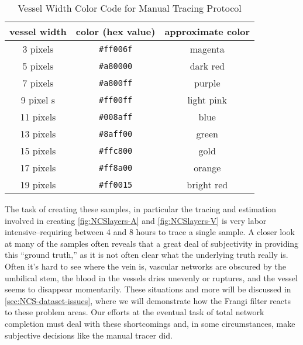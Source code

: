 \begin{table}
    \centering
\begin{tabular}{ccc}
    \hline
    \rule[-1ex]{0pt}{2.5ex}
    vessel width & color (hex value) & approximate color \\
    \hline 
    \rule[-1ex]{0pt}{2.5ex}
    3 pixels &  \texttt{\#ff006f} &   magenta \\                                      
    \rule[-1ex]{0pt}{2.5ex}
    5 pixels & \texttt{\#a80000}  & dark red \\                                      
    \rule[-1ex]{0pt}{2.5ex}
    7 pixels &  \texttt{\#a800ff} & purple \\                                          
    \rule[-1ex]{0pt}{2.5ex}
    9 pixel s&  \texttt{\#ff00ff}  & light pink \\
    \rule[-1ex]{0pt}{2.5ex}
    11 pixels &  \texttt{\#008aff} & blue \\                                          
    \rule[-1ex]{0pt}{2.5ex}
    13 pixels &  \texttt{\#8aff00} &   green \\                                        
    \rule[-1ex]{0pt}{2.5ex}
    15 pixels &  \texttt{\#ffc800} &  gold \\                                    
    \rule[-1ex]{0pt}{2.5ex}
    17 pixels & \texttt{\#ff8a00}  &  orange \\                                         
    \rule[-1ex]{0pt}{2.5ex}
    19 pixels & \texttt{\#ff0015}   &  bright red  \\
    \hline
\end{tabular}
\caption{Vessel Width Color Code for Manual Tracing Protocol}
\label{tab:widthcolors}
\end{table}


The task of creating these samples, in particular the tracing and estimation involved in creating \cref{fig:NCSlayers-A} and \cref{fig:NCSlayers-V} is very labor intensive--requiring between 4 and 8 hours to trace a single sample.
A closer look at many of the samples often reveals that a great deal of subjectivity in providing this ``ground truth,'' as it is not often clear what the underlying truth really is. Often it's hard to see where the vein is, vascular networks are obscured by the umbilical stem, the blood in the vessels dries unevenly or ruptures, and the vessel seems to disappear momentarily. These situations and more will be discussed in \cref{sec:NCS-dataset-issues}, where we will demonstrate how the Frangi filter reacts to these problem areas. Our efforts at the eventual task of total network completion must deal with these shortcomings and, in some circumstances, make subjective decisions like the manual tracer did.


